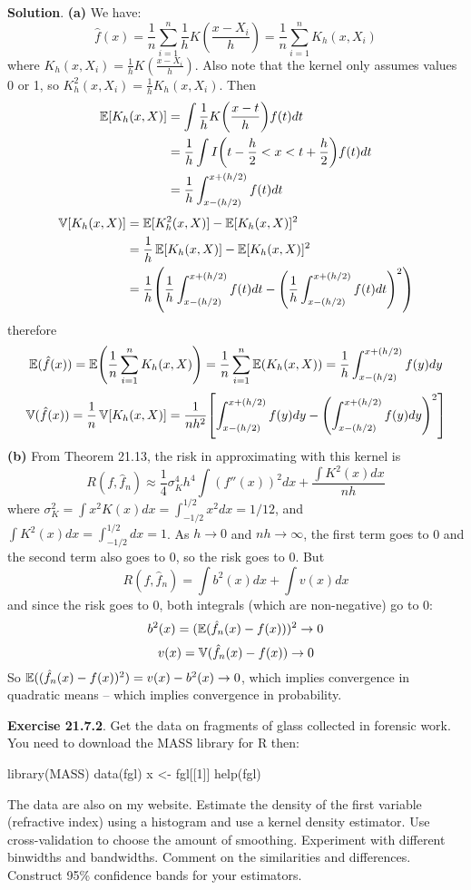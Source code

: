 \textbf{Solution}.
\textbf{(a)} We have:
\[
\hat{f}(x) = \frac{1}{n} \sum_{i=1}^{n} \frac{1}{h} K\left( \frac{x - X_{i}}{h} \right) = \frac{1}{n} \sum_{i=1}^{n} K_h(x, X_{i})
\]
where \(K_h(x, X_{i}) = \frac{1}{h} K\left( \frac{x - X_{i}}{h} \right)\).
Also note that the kernel only assumes values 0 or 1, so
\(K_h^{2}(x, X_{i}) = \frac{1}{h} K_h(x, X_{i})\).
Then
\begin{align*}
\EXP[K_h(x, X)] &= \int \frac{1}{h} K\left( \frac{x - t}{h} \right) f(t) dt \\
&= \frac{1}{h} \int I \left(t - \frac{h}{2} < x < t + \frac{h}{2} \right) f(t) dt \\
&= \frac{1}{h} \int_{x - (h/2)}^{x + (h/2)} f(t) dt
\end{align*}
\begin{align*}
\VAR[K_h(x, X)] &= \EXP[K_h^{2}(x, X)] - \EXP[K_h(x, X)]^{2} \\
&= \frac{1}{h} \EXP[K_h(x, X)] - \EXP[K_h(x, X)]^{2} \\
&= \frac{1}{h} \left(\frac{1}{h} \int_{x - (h/2)}^{x + (h/2)} f(t) dt - \left(\frac{1}{h} \int_{x - (h/2)}^{x + (h/2)} f(t) dt \right)^{2} \right)
\end{align*}
therefore
\[
\EXP(\hat{f}(x)) = \EXP \left( \frac{1}{n} \sum_{i=1}^{n} K_h(x, X) \right) = \frac{1}{n} \sum_{i=1}^{n}  \EXP \left( K_h(x, X)  \right) = \frac{1}{h} \int_{x - (h/2)}^{x + (h/2)} f(y) dy
\]
\[
\VAR(\hat{f}(x)) = \frac{1}{n} \VAR[K_h(x, X)] = \frac{1}{nh^{2}} \left[ \int_{x-(h/2)}^{x+(h/2)} f(y) dy  - \left( \int_{x-(h/2)}^{x+(h/2)} f(y) dy \right)^{2}\right]
\]
\textbf{(b)} From Theorem 21.13, the risk in approximating with this
kernel is
\[
R(f, \hat{f}_{n}) \approx \frac{1}{4} \sigma_K^{4} h^{4} \int (f''(x))^{2} dx + \frac{\int K^{2}(x)dx}{nh}
\]
where
\(\sigma_K^{2} = \int x^{2} K(x) dx = \int_{-1/2}^{1/2} x^{2} dx = 1/12\), and
\(\int K^{2}(x) dx = \int_{-1/2}^{1/2} dx = 1\). As \(h \rightarrow 0\)
and \(nh \rightarrow \infty\), the first term goes to 0 and the second
term also goes to 0, so the risk goes to 0.
But
\[
R(f, \hat{f}_{n}) = \int b^{2}(x) dx + \int v(x) dx
\]
and since the risk goes to 0, both integrals (which are non-negative) go
to 0:
\[
b^{2}(x) = (\operatorname{\mathbb{E}}(\hat{f}_{n}(x) - f(x)))^{2} \rightarrow 0
\]
\[
v(x) = \operatorname{\mathbb{V}}(\hat{f}_{n}(x) - f(x)) \rightarrow 0
\]
So
\(\operatorname{\mathbb{E}}((\hat{f}_{n}(x) - f(x))^{2}) = v(x) - b^{2}(x) \rightarrow 0\),
which implies convergence in quadratic means -- which implies
convergence in probability.

\textbf{Exercise 21.7.2}. Get the data on fragments of glass collected
in forensic work. You need to download the MASS library for R then:
\begin{console}
library(MASS)
data(fgl)
x <- fgl[[1]]
help(fgl)
\end{console}
The data are also on my website. Estimate the density of the first
variable (refractive index) using a histogram and use a kernel density
estimator. Use cross-validation to choose the amount of smoothing.
Experiment with different binwidths and bandwidths. Comment on the
similarities and differences. Construct 95\% confidence bands for your
estimators.

